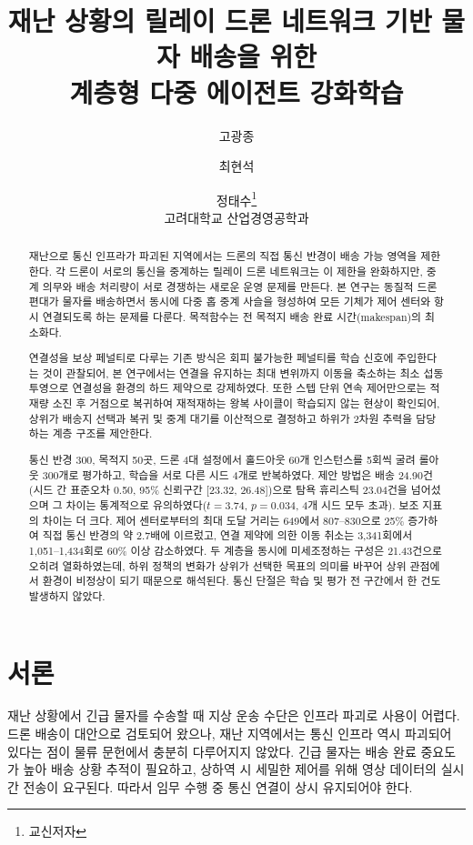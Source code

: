 \documentclass[12pt]{article}
\title{재난 상황의 릴레이 드론 네트워크 기반 물자 배송을 위한\\계층형 다중 에이전트 강화학습}
\author{고광종 \and 최현석 \and 정태수\thanks{교신저자}\\
고려대학교 산업경영공학과}
\date{}
\begin{document}
\maketitle

\begin{abstract}
재난으로 통신 인프라가 파괴된 지역에서는 드론의 직접 통신 반경이 배송 가능 영역을 제한한다.
각 드론이 서로의 통신을 중계하는 릴레이 드론 네트워크는 이 제한을 완화하지만, 중계 의무와
배송 처리량이 서로 경쟁하는 새로운 운영 문제를 만든다. 본 연구는 동질적 드론 편대가 물자를
배송하면서 동시에 다중 홉 중계 사슬을 형성하여 모든 기체가 제어 센터와 항시 연결되도록 하는
문제를 다룬다. 목적함수는 전 목적지 배송 완료 시간(makespan)의 최소화다.

연결성을 보상 페널티로 다루는 기존 방식은 회피 불가능한 페널티를 학습 신호에 주입한다는 것이
관찰되어, 본 연구에서는 연결을 유지하는 최대 변위까지 이동을 축소하는 최소 섭동 투영으로
연결성을 환경의 하드 제약으로 강제하였다. 또한 스텝 단위 연속 제어만으로는 적재량 소진 후
거점으로 복귀하여 재적재하는 왕복 사이클이 학습되지 않는 현상이 확인되어, 상위가 배송지 선택과
복귀 및 중계 대기를 이산적으로 결정하고 하위가 2차원 추력을 담당하는 계층 구조를 제안한다.

통신 반경 300, 목적지 50곳, 드론 4대 설정에서 홀드아웃 60개 인스턴스를 5회씩 굴려
롤아웃 300개로 평가하고, 학습을 서로 다른 시드 4개로 반복하였다. 제안 방법은 배송 24.90건
(시드 간 표준오차 0.50, 95\% 신뢰구간 [23.32, 26.48])으로 탐욕 휴리스틱 23.04건을 넘어섰으며
그 차이는 통계적으로 유의하였다($t=3.74$, $p=0.034$, 4개 시드 모두 초과). 보조 지표의 차이는
더 크다. 제어 센터로부터의 최대 도달 거리는 649에서 807--830으로 25\% 증가하여 직접 통신
반경의 약 2.7배에 이르렀고, 연결 제약에 의한 이동 취소는 3,341회에서 1,051--1,434회로 60\%
이상 감소하였다. 두 계층을 동시에 미세조정하는 구성은 21.43건으로 오히려 열화하였는데, 하위
정책의 변화가 상위가 선택한 목표의 의미를 바꾸어 상위 관점에서 환경이 비정상이 되기 때문으로
해석된다. 통신 단절은 학습 및 평가 전 구간에서 한 건도 발생하지 않았다.
\end{abstract}

\section{서론}

재난 상황에서 긴급 물자를 수송할 때 지상 운송 수단은 인프라 파괴로 사용이 어렵다. 드론 배송이
대안으로 검토되어 왔으나, 재난 지역에서는 통신 인프라 역시 파괴되어 있다는 점이 물류 문헌에서
충분히 다루어지지 않았다. 긴급 물자는 배송 완료 중요도가 높아 배송 상황 추적이 필요하고,
상하역 시 세밀한 제어를 위해 영상 데이터의 실시간 전송이 요구된다. 따라서 임무 수행 중 통신
연결이 상시 유지되어야 한다.
\end{document}
